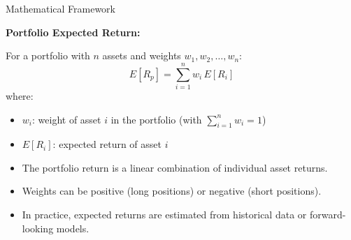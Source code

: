 \documentclass[9pt, aspectratio=169, t]{beamer}
\theoremstyle{definition}
\begin{document}
\begin{frame}{Mathematical Framework}

\textbf{Portfolio Expected Return:}

\vspace{0.2cm}

For a portfolio with $n$ assets and weights $w_1, w_2, \ldots, w_n$:
\[
E[R_p] = \sum_{i=1}^{n} w_i\, E[R_i]
\]
where:
\begin{itemize}
    \item $w_i$: weight of asset $i$ in the portfolio (with $\sum_{i=1}^n w_i = 1$)
    \item $E[R_i]$: expected return of asset $i$
\end{itemize}

\vspace{0.3cm}

\begin{itemize}
    \item The portfolio return is a linear combination of individual asset returns.
    \item Weights can be positive (long positions) or negative (short positions).
    \item In practice, expected returns are estimated from historical data or forward-looking models.
\end{itemize}

\end{frame}
\end{document}
